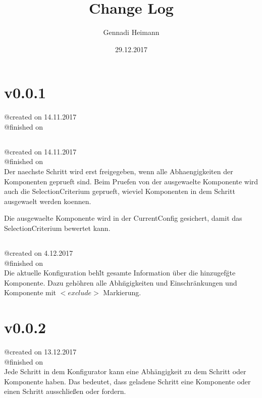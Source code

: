 \documentclass{article}
\begin{document}
\begin{titlepage}
\author{Gennadi Heimann} 
\title{Change Log} 
\date{29.12.2017} 
\maketitle
\end{titlepage}

\section{v0.0.1}
@created on 14.11.2017\\
@finished on \\

\subsection{}
@created on     14.11.2017\\
@finished on   \\

Der naechste Schritt wird erst freigegeben, wenn alle Abhaengigkeiten 
der Komponenten geprueft sind. Beim Pruefen von der ausgewaelte 
Komponente wird auch die SelectionCriterium geprueft, wieviel Komponenten 
in dem Schritt ausgewaelt werden koennen.

Die ausgewaelte Komponente wird in der CurrentConfig gesichert, damit das
SelectionCriterium bewertet kann.

\subsection{}
@created on     4.12.2017\\
@finished on   \\

Die aktuelle Konfiguration beh\"lt gesamte Information \"uber die hinzugef\"gte
Komponente. Dazu geh\"ohren alle Abh\"ngigkeiten und Einschr\"ankungen und
Komponente mit $<exclude>$ Markierung.


\section{v0.0.2}
@created on 13.12.2017\\
@finished on \\
Jede Schritt in dem Konfigurator kann eine Abh\"angigkeit zu dem Schritt oder
Komponente haben. Das bedeutet, dass geladene Schritt eine Komponente oder einen
Schritt ausschlie\ss{}en oder fordern.
\end{document}
